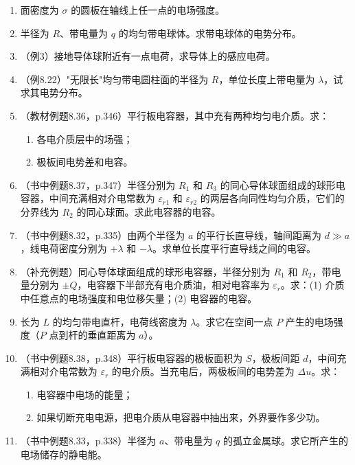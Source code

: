 \documentclass{ctexart}
\begin{document}
\begin{enumerate}
\item 面密度为 $\sigma$ 的圆板在轴线上任一点的电场强度。

\item 半径为 $R$、带电量为 $q$ 的均匀带电球体。求带电球体的电势分布。

\item（例3）接地导体球附近有一点电荷，求导体上的感应电荷。

\item（例8.22）"无限长"均匀带电圆柱面的半径为 $R$，单位长度上带电量为 $\lambda$，试求其电势分布。

\item（教材例题8.36，p.346）平行板电容器，其中充有两种均匀电介质。求：
\begin{enumerate}
  \item 各电介质层中的场强；
  \item 极板间电势差和电容。
\end{enumerate}

\item（书中例题8.37，p.347）半径分别为 $R_1$ 和 $R_3$ 的同心导体球面组成的球形电容器，中间充满相对介电常数为 $\varepsilon_{r1}$ 和 $\varepsilon_{r2}$ 的两层各向同性均匀介质，它们的分界线为 $R_2$ 的同心球面。求此电容器的电容。

\item（书中例题8.32，p.335）由两个半径为 $a$ 的平行长直导线，轴间距离为 $d \gg a$，线电荷密度分别为 $+\lambda$ 和 $-\lambda$。求单位长度平行直导线之间的电容。

\item（补充例题）同心导体球面组成的球形电容器，半径分别为 $R_1$ 和 $R_2$，带电量分别为 $\pm Q$，电容器下半部充有电介质油，相对电容率为 $\varepsilon_r$。求：(1) 介质中任意点的电场强度和电位移矢量；(2) 电容器的电容。

\item 长为 $L$ 的均匀带电直杆，电荷线密度为 $\lambda$。求它在空间一点 $P$ 产生的电场强度（$P$ 点到杆的垂直距离为 $a$）。

\item（书中例题8.38，p.348）平行板电容器的极板面积为 $S$，极板间距 $d$，中间充满相对介电常数为 $\varepsilon_r$ 的电介质。当充电后，两极板间的电势差为 $\Delta u$。求：
\begin{enumerate}
  \item 电容器中电场的能量；
  \item 如果切断充电电源，把电介质从电容器中抽出来，外界要作多少功。
\end{enumerate}

\item（书中例题8.33，p.338）半径为 $a$、带电量为 $q$ 的孤立金属球。求它所产生的电场储存的静电能。


\end{enumerate}
\end{document}
